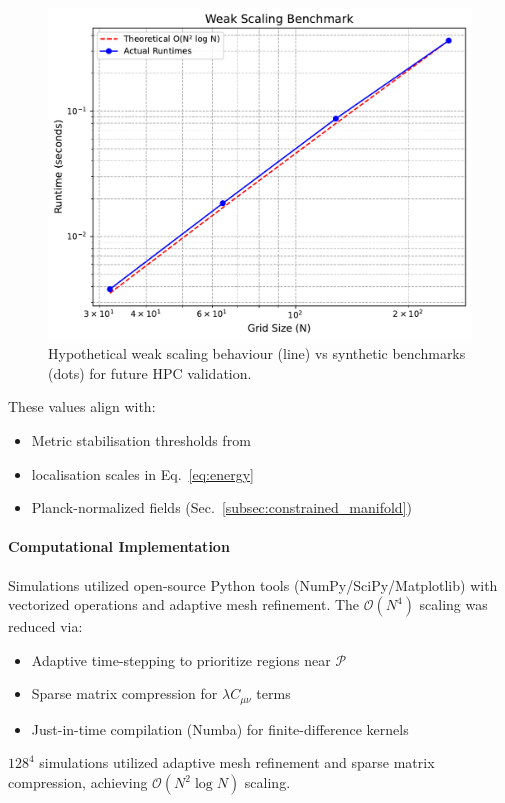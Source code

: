 \documentclass[twocolumn]{article}
\newcommand{\fpit}{\mathcal{P}}
\begin{document}
	\begin{figure}[htbp]  
		\centering  
		\includegraphics[width=0.8\linewidth]{figures/scaling_benchmark.pdf}
		\caption{Hypothetical weak scaling behaviour (line) vs synthetic benchmarks (dots) for future HPC validation.}\label{fig:convergence_benchmark}
	\end{figure}
	
	These values align with:  
	\begin{itemize}
		\item Metric stabilisation thresholds from\cite{Choptuik1993}
		\item localisation scales in Eq.~\eqref{eq:energy}
		\item Planck-normalized fields (Sec.~\ref{subsec:constrained_manifold})
	\end{itemize}
	
	\paragraph{Computational Implementation}
	Simulations utilized open-source Python tools (NumPy/SciPy/Matplotlib) with vectorized operations and adaptive mesh refinement\cite{berger1984}. The $\mathcal{O}(N^4)$ scaling was reduced via:  
	\begin{itemize}
		\item Adaptive time-stepping to prioritize regions near $\fpit$  
		\item Sparse matrix compression for $\lambda C_{\mu\nu}$ terms  
		\item Just-in-time compilation (Numba) for finite-difference kernels  
	\end{itemize}
	
	$128^4$ simulations utilized adaptive mesh refinement\cite{berger1984} and sparse matrix compression, achieving $\mathcal{O}(N^2 \log N)$ scaling.
	
\end{document}
